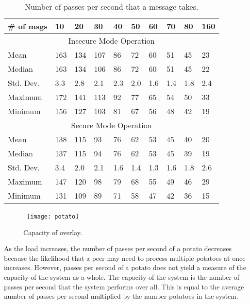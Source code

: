 \documentclass[11pt]{article}
\begin{document}
\begin{table}[htb]
\begin{center}
\begin{tabular}{|l|l|l|l|l|l|l|l|l|l|}
\hline
\# of msgs & 10   & 20   & 30   & 40   & 50   & 60   & 70   & 80   & 160 \\
\hline
\hline
\multicolumn{10}{|c|}{Insecure Mode Operation} \\
\hline
Mean       & 163  & 134  & 107  & 86   & 72   & 60   & 51   & 45   & 23 \\
Median     & 163  & 134  & 106  & 86   & 72   & 60   & 51   & 45   & 22 \\
Std. Dev.  & 3.3  & 2.8  & 2.1  & 2.3  & 2.0  & 1.6  & 1.4  & 1.8  & 2.4 \\
Maximum    & 172  & 141  & 113  & 92   & 77   & 65   & 54   & 50   & 33 \\
Minimum    & 156  & 127  & 103  & 81   & 67   & 56   & 48   & 42   & 19 \\
\hline
\hline
\multicolumn{10}{|c|}{Secure Mode Operation} \\
\hline
Mean       & 138  & 115  & 93   & 76   & 62   & 53   & 45   & 40   & 20 \\
Median     & 137  & 115  & 94   & 76   & 62   & 53   & 45   & 39   & 19 \\
Std. Dev.  & 3.4  & 2.0  & 2.1  & 1.6  & 1.4  & 1.3  & 1.6  & 1.8  & 2.6 \\
Maximum    & 147  & 120  & 98   & 79   & 68   & 55   & 49   & 46   & 29 \\
Minimum    & 131  & 109  & 89   & 71   & 58   & 47   & 42   & 36   & 15 \\
\hline
\end{tabular}
  \caption{Number of passes per second that a message takes. \label{tab:passes}}
\end{center}
\end{table}

\begin{figure*}[htb]
  \begin{center}
  \ \texttt{[image: potato]}\ 
  \caption{Capacity of overlay.\label{fig:cap}}
  \end{center}
\end{figure*}

As the load increases, the number of passes per second of a potato
decreases because the likelihood that a peer may need to process
multiple potatoes at once increases.   However, passes per second
of a potato does not yield a measure of the capacity of the system
as a whole.  The capacity of the system is the number of passes per
second that the system performs over all.  This is equal to the
average number of passes per second multiplied by the number potatoes
in the system.
\end{document}

